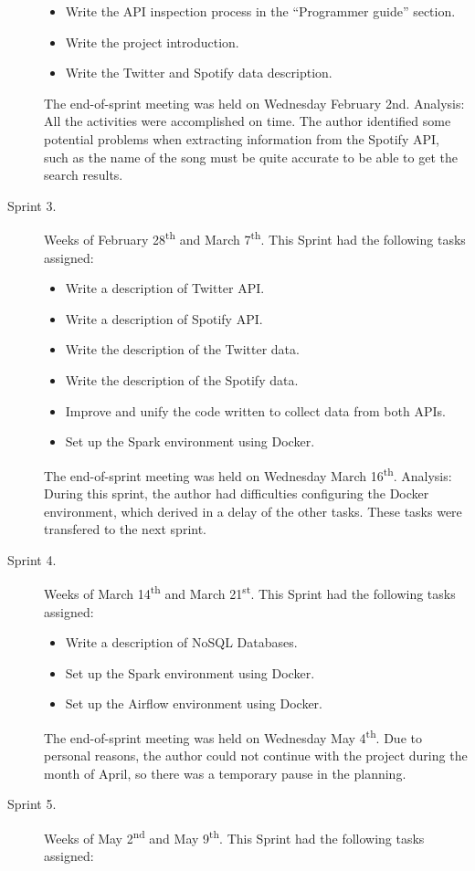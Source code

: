 \begin{description}
\begin{itemize}
		\item Write the API inspection process in the ``Programmer guide'' section.
		\item Write the project introduction.
		\item Write the Twitter and Spotify data description.
	\end{itemize}
	The end-of-sprint meeting was held on Wednesday February 2nd.
	Analysis: All the activities were accomplished on time. The author identified some potential problems when extracting information from the Spotify API, such as the name of the song must be quite accurate to be able to get the search results.
	\item[Sprint 3.] Weeks of February 28\textsuperscript{th} and March 7\textsuperscript{th}. This Sprint had the following tasks assigned:
	\begin{itemize}		
		\item Write a description of Twitter API.
		\item Write a description of Spotify API.
		\item Write the description of the Twitter data.
		\item Write the description of the Spotify data.
		\item Improve and unify the code written to collect data from both APIs.
		\item Set up the Spark environment using Docker.
	\end{itemize}
	The end-of-sprint meeting was held on Wednesday March 16\textsuperscript{th}.
	Analysis: During this sprint, the author had difficulties configuring the Docker environment, which derived in a delay of the other tasks. These tasks were transfered to the next sprint.
	\item[Sprint 4.] Weeks of March 14\textsuperscript{th} and March 21\textsuperscript{st}. This Sprint had the following tasks assigned:
	\begin{itemize}
		\item Write a description of NoSQL Databases.
		\item Set up the Spark environment using Docker.
		\item Set up the Airflow environment using Docker.
	\end{itemize}
	The end-of-sprint meeting was held on Wednesday May 4\textsuperscript{th}. Due to personal reasons, the author could not continue with the project during the month of April, so there was a temporary pause in the planning.
	\item[Sprint 5.] Weeks of May 2\textsuperscript{nd} and May 9\textsuperscript{th}. This Sprint had the following tasks assigned:

\end{description}
